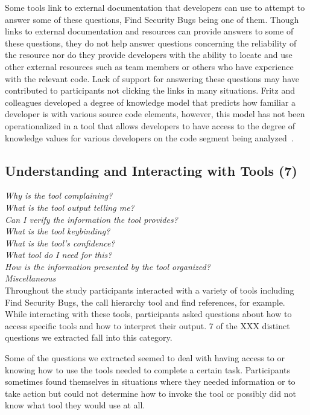 \documentclass[conference]{IEEEtran}
\begin{document}
Some tools link to external documentation that developers can use to attempt to answer some of these questions, Find Security Bugs being one of them. Though links to external documentation and resources can provide answers to  some of these questions, they do not help answer questions concerning the reliability of the resource nor do they provide developers with the ability to locate and use other external resources such as team members or others who have experience with the relevant code. Lack of support for answering these questions may have contributed to participants not clicking the links in many situations. Fritz and colleagues developed a degree of knowledge model that predicts how familiar a developer is with various source code elements, however, this model has not been operationalized in a tool that allows developers to have access to the degree of knowledge values for various developers on the code segment being analyzed~\cite{fritz2010degree}.



\noindent\subsection{\textbf{Understanding and Interacting with Tools (7)}}

\noindent\emph{Why is the tool complaining?} \\
\emph{What is the tool output telling me?} \\
\emph{Can I verify the information the tool provides?} \\
\emph{What is the tool keybinding?} \\
\emph{What is the tool's confidence?} \\
\emph{What tool do I need for this?} \\
\emph{How is the information presented by the tool organized?} \\
\emph{Miscellaneous} \\

Throughout the study participants interacted with a variety of tools including Find Security Bugs, the call hierarchy tool and find references, for example. While interacting with these tools, participants asked questions about how to access specific tools and how to interpret their output. 7 of the XXX distinct questions we extracted fall into this category.

Some of the questions we extracted seemed to deal with having access to or knowing how to use the tools needed to complete a certain task. Participants sometimes found themselves in situations where they needed information or to take action but could not determine how to invoke the tool or possibly did not know what tool they would use at all. 
\end{document}
